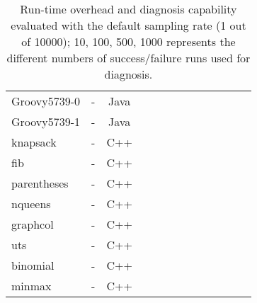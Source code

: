 \begin{table}[h!]
\begin{tabular}{lcccccccccccc}
    \midrule
    Groovy5739-0      & -  & Java  &  &              &    &                                 &                   &                           &                                \\
    Groovy5739-1      & -  & Java  &  &              &    &                                 &                   &                           &                               \\
    \midrule
    \midrule
    knapsack      &  -  & C++  &  &              &    &                                 &                   &                           &                              \\
    fib      &  - & C++  &  &              &    &                                 &                   &                           &                                \\
    parentheses      & -   & C++  &  &              &    &                                 &                   &                           &                                \\
    nqueens      &  -  & C++  &  &              &    &                                 &                   &                           &                                \\
    graphcol      &  -  & C++  &  &              &    &                                 &                   &                           &                              \\
    uts      &  -  & C++  &  &              &    &                                 &                   &                           &                               \\
    binomial      &  -  & C++  &  &              &    &                                 &                   &                           &                                \\
    minmax      &  -  & C++  &  &              &    &                                 &                   &                           &                               \\


    \bottomrule
   \end{tabular}
  \caption{Run-time overhead and diagnosis capability evaluated with the default sampling rate (1 out of 10000); 10, 100, 500, 1000 represents the different numbers of success/failure runs used for diagnosis.}
  \label{tab:LBR}
\end{table}